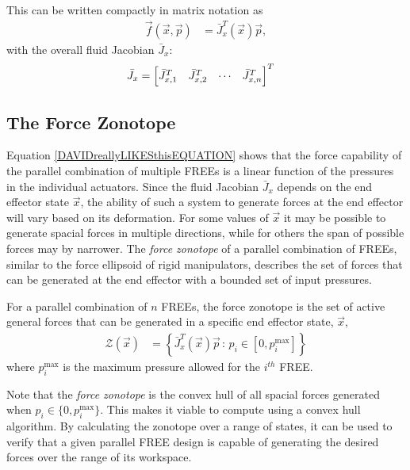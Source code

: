 This can be written compactly in matrix notation as 
\begin{align}
    \vec{f} (\vec{x}, \vec{p}) &= \bar{J}^T_x (\vec{x}) \vec{p}, \label{DAVIDreallyLIKESthisEQUATION}
\end{align}
with the overall fluid Jacobian $\bar{J}_x$:
\begin{align}
    \bar{J}_x &= \begin{bmatrix} \bar{J}^T_{x, 1} & \bar{J}^T_{x, 2} & \cdots & \bar{J}^T_{x, n} \end{bmatrix}^T
\end{align}

\subsection{The Force Zonotope}
Equation \eqref{DAVIDreallyLIKESthisEQUATION} shows that the force capability of the parallel combination of multiple FREEs is a linear function of the pressures in the individual actuators.
Since the fluid Jacobian $\bar{J}_{x}$ depends on the end effector state $\vec{x}$, the ability of such a system to generate forces at the end effector will vary based on its deformation.
For some values of $\vec{x}$ it may be possible to generate spacial forces in multiple directions, while for others the span of possible forces may by narrower. 
The \emph{force zonotope} of a parallel combination of FREEs, similar to the force ellipsoid of rigid manipulators, 
describes the set of forces that can be generated at the end effector with a bounded set of input pressures.

\begin{definition}
    For a parallel combination of $n$ FREEs, the force zonotope is the set of active general 
    forces that can be generated in a specific end effector state, $\vec{x}$,
    \begin{align}
        \mathcal{Z}(\vec{x}) &= \left\{\bar{J}^T_x (\vec{x}) \vec{p} \, : \, p_i \in [0,p_i^\text{max}] \right\}     \label{eq:zonotope}
    \end{align}
    where $p_i^{\text{max}}$ is the maximum pressure allowed for the $i^{th}$ FREE.
\end{definition}

Note that the \emph{force zonotope} is the convex hull of all spacial forces generated when $p_i \in \{0, p_i^{\text{max}}\}$.
This makes it viable to compute using a convex hull algorithm. By calculating the zonotope over a range of states, it can be used to verify that a given parallel FREE design is capable of generating the desired forces over the range of its workspace. 


